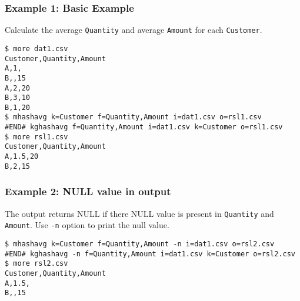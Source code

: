 \subsubsection*{Example 1: Basic Example}

Calculate the average \verb|Quantity| and average \verb|Amount| for each \verb|Customer|.


\begin{Verbatim}[baselinestretch=0.7,frame=single]
$ more dat1.csv
Customer,Quantity,Amount
A,1,
B,,15
A,2,20
B,3,10
B,1,20
$ mhashavg k=Customer f=Quantity,Amount i=dat1.csv o=rsl1.csv
#END# kghashavg f=Quantity,Amount i=dat1.csv k=Customer o=rsl1.csv
$ more rsl1.csv
Customer,Quantity,Amount
A,1.5,20
B,2,15
\end{Verbatim}
\subsubsection*{Example 2: NULL value in output}

The output returns NULL if there NULL value is present in \verb|Quantity| and \verb|Amount|. Use \verb|-n| option to print the null value.


\begin{Verbatim}[baselinestretch=0.7,frame=single]
$ mhashavg k=Customer f=Quantity,Amount -n i=dat1.csv o=rsl2.csv
#END# kghashavg -n f=Quantity,Amount i=dat1.csv k=Customer o=rsl2.csv
$ more rsl2.csv
Customer,Quantity,Amount
A,1.5,
B,,15
\end{Verbatim}
